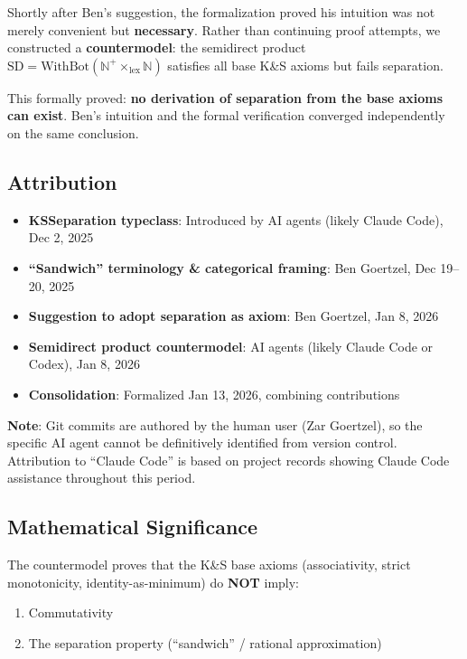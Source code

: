 \documentclass[11pt]{article}
\theoremstyle{definition}
\theoremstyle{remark}
\begin{document}
Shortly after Ben's suggestion, the formalization proved his intuition was not merely
convenient but \textbf{necessary}. Rather than continuing proof attempts, we constructed
a \textbf{countermodel}: the semidirect product
$\text{SD} = \text{WithBot}(\mathbb{N}^+ \times_{\text{lex}} \mathbb{N})$
satisfies all base K\&S axioms but fails separation.

This formally proved: \textbf{no derivation of separation from the base axioms can exist}.
Ben's intuition and the formal verification converged independently on the same conclusion.

\subsection*{Attribution}

\begin{itemize}
\item \textbf{KSSeparation typeclass}: Introduced by AI agents (likely Claude Code), Dec 2, 2025
\item \textbf{``Sandwich'' terminology \& categorical framing}: Ben Goertzel, Dec 19--20, 2025
\item \textbf{Suggestion to adopt separation as axiom}: Ben Goertzel, Jan 8, 2026
\item \textbf{Semidirect product countermodel}: AI agents (likely Claude Code or Codex), Jan 8, 2026
\item \textbf{Consolidation}: Formalized Jan 13, 2026, combining contributions
\end{itemize}

\textbf{Note}: Git commits are authored by the human user (Zar Goertzel), so the specific AI
agent cannot be definitively identified from version control. Attribution to ``Claude Code''
is based on project records showing Claude Code assistance throughout this period.

\subsection*{Mathematical Significance}

The countermodel proves that the K\&S base axioms (associativity, strict monotonicity,
identity-as-minimum) do \textbf{NOT} imply:
\begin{enumerate}
\item Commutativity
\item The separation property (``sandwich'' / rational approximation)
\end{enumerate}
\end{document}
